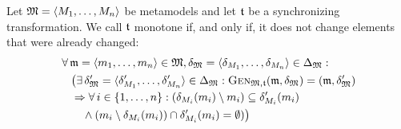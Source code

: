 \begin{definition}
    \label{def:monotonetransformation}
    Let $\metamodeltuple{M} = \tupled{\metamodelsequence{M}{n}}$ be metamodels and let $\transformation{t}$ be a synchronizing transformation. We call $\transformation{t}$ monotone if, and only if, it does not change elements that were already changed:
    \begin{align*}
        &
        \forall \modeltuple{m} = \tupled{\model{m}{1}, \dots, \model{m}{n}} \in \metamodeltuple{M}, \changetuple{\metamodeltuple{M}} = \tupled{\change{\metamodel{M}{1}}, \dots, \change{\metamodel{M}{n}}} \in \changeuniverse{\metamodeltuple{M}} : \\
        & \formulaskip
        \bigl(
        \exists \changetuple{\metamodeltuple{M}}' = \tupled{\change{\metamodel{M}{1}}', \dots, \change{\metamodel{M}{n}}'} \in \changeuniverse{\metamodeltuple{M}} : \generalizationfunction{\metamodeltuple{M},\transformation{t}}(\modeltuple{m}, \changetuple{\metamodeltuple{M}}) = (\modeltuple{m},\changetuple{\metamodeltuple{M}}') \\
        & \formulaskip
        \Rightarrow
        \forall i \in \setted{1, \dots, n} : 
        (\change{\metamodel{M}{i}}(\model{m}{i}) \setminus \model{m}{i}) \subseteq \change{\metamodel{M}{i}}'%
        (\model{m}{i})%
        \\
        & \formulaskip\formulaskip
        \land
        (\model{m}{i} \setminus \change{\metamodel{M}{i}}(\model{m}{i})) \cap \change{\metamodel{M}{i}}'%
        (\model{m}{i})%
         = \emptyset)
        \bigr)
    \end{align*}
\end{definition}

